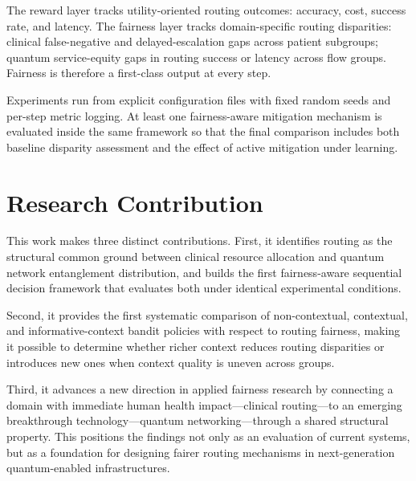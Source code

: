 \documentclass{IEEEtran}
\begin{document}
The reward layer tracks utility-oriented routing outcomes: accuracy, cost,
success rate, and latency. The fairness layer tracks domain-specific routing
disparities: clinical false-negative and delayed-escalation gaps across
patient subgroups; quantum service-equity gaps in routing success or latency
across flow groups. Fairness is therefore a first-class output at every step.

Experiments run from explicit configuration files with fixed random seeds and
per-step metric logging. At least one fairness-aware mitigation mechanism is
evaluated inside the same framework so that the final comparison includes
both baseline disparity assessment and the effect of active mitigation under
learning.

\section{Research Contribution}

This work makes three distinct contributions. First, it identifies routing
as the structural common ground between clinical resource allocation and
quantum network entanglement distribution, and builds the first
fairness-aware sequential decision framework that evaluates both under
identical experimental conditions.

Second, it provides the first systematic comparison of non-contextual,
contextual, and informative-context bandit policies with respect to routing
fairness, making it possible to determine whether richer context reduces
routing disparities or introduces new ones when context quality is uneven
across groups.

Third, it advances a new direction in applied fairness research by connecting
a domain with immediate human health impact---clinical routing---to an
emerging breakthrough technology---quantum networking---through a shared
structural property. This positions the findings not only as an evaluation
of current systems, but as a foundation for designing fairer routing
mechanisms in next-generation quantum-enabled infrastructures.
\end{document}
